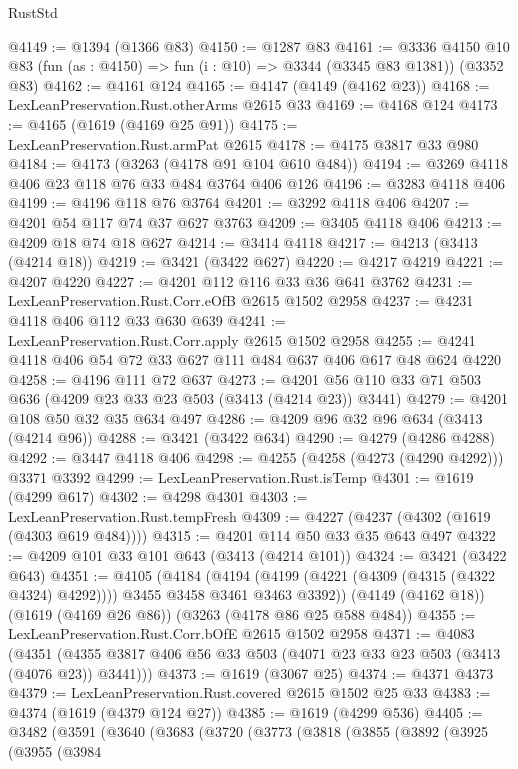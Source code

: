 \begin{lexlean}{RustStd}
\begin{coremodule}
@4149 := @1394 (@1366 @83)
@4150 := @1287 @83
@4161 := @3336
    @4150
    @10
    @83
    (fun (as : @4150) => fun (i : @10) => @3344 (@3345 @83 @1381))
    (@3352 @83)
@4162 := @4161 @124
@4165 := @4147 (@4149 (@4162 @23))
@4168 := LexLeanPreservation.Rust.otherArms @2615 @33
@4169 := @4168 @124
@4173 := @4165 (@1619 (@4169 @25 @91))
@4175 := LexLeanPreservation.Rust.armPat @2615
@4178 := @4175 @3817 @33 @980
@4184 := @4173 (@3263 (@4178 @91 @104 @610 @484))
@4194 := @3269 @4118 @406 @23 @118 @76 @33 @484 @3764 @406 @126
@4196 := @3283 @4118 @406
@4199 := @4196 @118 @76 @3764
@4201 := @3292 @4118 @406
@4207 := @4201 @54 @117 @74 @37 @627 @3763
@4209 := @3405 @4118 @406
@4213 := @4209 @18 @74 @18 @627
@4214 := @3414 @4118
@4217 := @4213 (@3413 (@4214 @18))
@4219 := @3421 (@3422 @627)
@4220 := @4217 @4219
@4221 := @4207 @4220
@4227 := @4201 @112 @116 @33 @36 @641 @3762
@4231 := LexLeanPreservation.Rust.Corr.eOfB @2615 @1502 @2958
@4237 := @4231 @4118 @406 @112 @33 @630 @639
@4241 := LexLeanPreservation.Rust.Corr.apply @2615 @1502 @2958
@4255 := @4241 @4118 @406 @54 @72 @33 @627 @111 @484 @637 @406 @617 @48 @624 @4220
@4258 := @4196 @111 @72 @637
@4273 := @4201 @56 @110 @33 @71 @503 @636 (@4209 @23 @33 @23 @503 (@3413 (@4214 @23)) @3441)
@4279 := @4201 @108 @50 @32 @35 @634 @497
@4286 := @4209 @96 @32 @96 @634 (@3413 (@4214 @96))
@4288 := @3421 (@3422 @634)
@4290 := @4279 (@4286 @4288)
@4292 := @3447 @4118 @406
@4298 := @4255 (@4258 (@4273 (@4290 @4292))) @3371 @3392
@4299 := LexLeanPreservation.Rust.isTemp
@4301 := @1619 (@4299 @617)
@4302 := @4298 @4301
@4303 := LexLeanPreservation.Rust.tempFresh
@4309 := @4227 (@4237 (@4302 (@1619 (@4303 @619 @484))))
@4315 := @4201 @114 @50 @33 @35 @643 @497
@4322 := @4209 @101 @33 @101 @643 (@3413 (@4214 @101))
@4324 := @3421 (@3422 @643)
@4351 := @4105
    (@4184
      (@4194 (@4199 (@4221 (@4309 (@4315 (@4322 @4324) @4292)))) @3455 @3458 @3461 @3463 @3392))
    (@4149 (@4162 @18))
    (@1619 (@4169 @26 @86))
    (@3263 (@4178 @86 @25 @588 @484))
@4355 := LexLeanPreservation.Rust.Corr.bOfE @2615 @1502 @2958
@4371 := @4083
    (@4351 (@4355 @3817 @406 @56 @33 @503 (@4071 @23 @33 @23 @503 (@3413 (@4076 @23)) @3441)))
@4373 := @1619 (@3067 @25)
@4374 := @4371 @4373
@4379 := LexLeanPreservation.Rust.covered @2615 @1502 @25 @33
@4383 := @4374 (@1619 (@4379 @124 @27))
@4385 := @1619 (@4299 @536)
@4405 := @3482
    (@3591
      (@3640
        (@3683
          (@3720
            (@3773
              (@3818
                (@3855
                  (@3892
                    (@3925
                      (@3955
                        (@3984

\end{coremodule}
\end{lexlean}
